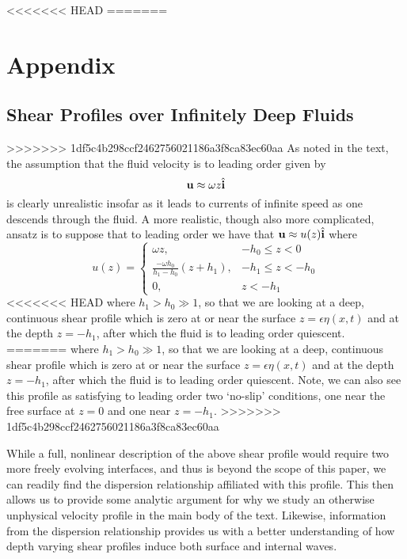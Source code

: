 \documentclass[a4paper,11pt]{article}
\newcommand{\ba}{\begin{array}}
\newcommand{\ea}{\end{array}}
\begin{document}
<<<<<<< HEAD
=======
\section*{Appendix}
\subsection*{Shear Profiles over Infinitely Deep Fluids}
>>>>>>> 1df5c4b298ccf2462756021186a3f8ca83ec60aa
As noted in the text, the assumption that the fluid velocity is to leading order given by 
\[
{\bf u} \approx \omega z \hat{{\bf i}}
\]
is clearly unrealistic insofar as it leads to currents of infinite speed as one descends through the fluid.  A more realistic, though also more complicated, ansatz is to suppose that to leading order we have that ${\bf u}\approx u(z)\hat{{\bf i}}$ where  
\[
u(z) = \left\{\ba{rl} \omega z, & -h_{0} \leq z < 0 \\
\frac{-\omega h_{0}}{h_{1}-h_{0}} (z+h_{1}), & -h_{1} \leq z < -h_{0} \\
0, & z < -h_{1}
\ea \right.
\] 
<<<<<<< HEAD
where $h_{1}>h_{0}\gg 1$, so that we are looking at a deep, continuous shear profile which is zero at or near the surface $z=\epsilon \eta(x,t)$ and at the depth $z=-h_{1}$, after which the fluid is to leading order quiescent.
=======
where $h_{1}>h_{0}\gg 1$, so that we are looking at a deep, continuous shear profile which is zero at or near the surface $z=\epsilon \eta(x,t)$ and at the depth $z=-h_{1}$, after which the fluid is to leading order quiescent.  Note, we can also see this profile as satisfying to leading order two `no-slip' conditions, one near the free surface at $z=0$ and one near $z=-h_{1}$.
>>>>>>> 1df5c4b298ccf2462756021186a3f8ca83ec60aa

While a full, nonlinear description of the above shear profile would require two more freely evolving interfaces, and thus is beyond the scope of this paper, we can readily find the dispersion relationship affiliated with this profile.  This then allows us to provide some analytic argument for why we study an otherwise unphysical velocity profile in the main body of the text.  Likewise, information from the dispersion relationship provides us with a better understanding of how depth varying shear profiles induce both surface and internal waves.
\end{document}
